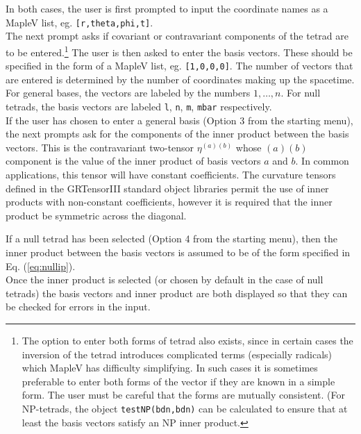 \documentclass{article}
\begin{document}
In both cases, the user is first prompted to input the coordinate names
as a MapleV list, eg. \texttt{[r,theta,phi,t]}.\\

The next prompt asks if covariant or contravariant components of the
tetrad are to be entered.\footnote{The option to enter both forms of
tetrad also exists, since in certain cases the inversion of the tetrad
introduces complicated terms (especially radicals) which MapleV has
difficulty simplifying. In such cases it is sometimes preferable to
enter both forms of the vector if they are known in a simple form. The
user must be careful that the forms are mutually consistent. (For
NP-tetrads, the object \texttt{testNP(bdn,bdn)} can be calculated to ensure
that at least the basis vectors satisfy an NP inner product.} The user
is then asked to enter the basis vectors.  These should be specified
in the form of a MapleV list, eg. \texttt{[1,0,0,0]}.  The number of
vectors that are entered is determined by the number of coordinates
making up the spacetime. For general bases, the vectors are labeled
by the numbers $1, \ldots, n$. For null tetrads, the basis vectors are
labeled \texttt{l}, \texttt{n}, \texttt{m}, \texttt{mbar}
respectively.\\

If the user has chosen to enter a general basis (Option 3 from the
 starting menu), the next prompts ask for the components
of the inner product between the basis vectors. This is the
contravariant two-tensor $\eta^{(a)(b)}$ whose $(a)(b)$ component is
the value of the inner product of basis vectors $a$ and $b$.  In
common applications, this tensor will have constant coefficients. The
curvature tensors defined in the GRTensorIII standard object libraries
permit the use of inner products with non-constant coefficients,
however it is required that the inner product be symmetric across the
diagonal.

If a null tetrad has been selected (Option 4 from the starting menu),
then the inner product between the basis vectors is assumed to be of the
form specified in Eq. (\ref{eq:nullip}).\\

Once the inner product is selected (or chosen by default in the case
of null tetrads) the basis vectors and inner product are both
displayed so that they can be checked for errors in the input.
%
\end{document}
